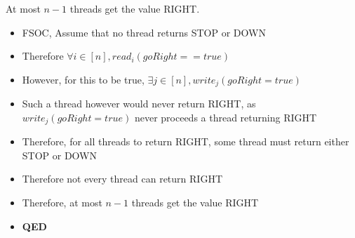 \documentclass[]{article}
\begin{document}
At most $n - 1$ threads get the value RIGHT.
\begin{itemize}
	\item FSOC, Assume that no thread returns STOP or DOWN
	\item Therefore $\forall i \in [n], read_i(goRight == true)$
	\item However, for this to be true, $\exists j \in [n], write_j(goRight = true)$
	\item Such a thread however would never return RIGHT, as $write_j(goRight = true)$ never proceeds a thread returning RIGHT
	\item Therefore, for all threads to return RIGHT, some thread must return either STOP or DOWN
	\item Therefore not every thread can return RIGHT
	\item Therefore, at most $n - 1$ threads get the value RIGHT
	\item \textbf{QED}
\end{itemize}
\end{document}
